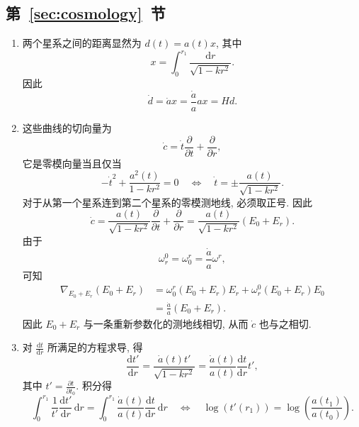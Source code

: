 \subsection{\texorpdfstring{第~\ref{sec:cosmology}~节}{宇宙学}}\label{subsec:solutions-cosmology}

\begin{description}[font=\normalfont,leftmargin=2em,labelwidth=1.5em]
\begin{enumerate}[label=(\alph*),ref=\alph*,leftmargin=*]
\item 两个星系之间的距离显然为 $d(t)=a(t)x$, 其中
\[
  x=\int_0^{r_1}\frac{\mathrm{d}r}{\sqrt{1-kr^2}}.
\]
因此
\[
  \dot d=\dot a x=\frac{\dot a}{a}ax=Hd.
\]
\item 这些曲线的切向量为
\[
  \dot c=\dot t\frac{\partial}{\partial t}+\frac{\partial}{\partial r},
\]
它是零模向量当且仅当
\[
  -\dot t^2+\frac{a^2(t)}{1-kr^2}=0
  \quad\Longleftrightarrow\quad \dot t=\pm\frac{a(t)}{\sqrt{1-kr^2}}.
\]
对于从第一个星系连到第二个星系的零模测地线, 必须取正号. 因此
\[
  \dot c=\frac{a(t)}{\sqrt{1-kr^2}}\frac{\partial}{\partial t}
    +\frac{\partial}{\partial r}=\frac{a(t)}{\sqrt{1-kr^2}}(E_0+E_r).
\]
由于
\[
  \omega_r^0=\omega_0^r=\frac{\dot a}{a}\omega^r,
\]
可知
\begin{align*}
  \nabla_{E_0+E_r}(E_0+E_r)
    &=\omega_0^r(E_0+E_r)E_r+\omega_r^0(E_0+E_r)E_0\\
    &=\frac{\dot a}{a}(E_0+E_r).
\end{align*}
因此 $E_0+E_r$ 与一条重新参数化的测地线相切, 从而 $\dot c$ 也与之相切.
\item 对 $\frac{\mathrm{d}t}{\mathrm{d}r}$ 所满足的方程求导, 得
\[
  \frac{\mathrm{d}t'}{\mathrm{d}r}
     =\frac{\dot a(t)t'}{\sqrt{1-kr^2}}
     =\frac{\dot a(t)}{a(t)}\frac{\mathrm{d}t}{\mathrm{d}r}t',
\]
其中 $t'=\frac{\partial t}{\partial t_0}$. 积分得
\[
  \int_0^{r_1}\frac{1}{t'}\frac{\mathrm{d}t'}{\mathrm{d}r}\,\mathrm{d}r
    =\int_0^{r_1}\frac{\dot a(t)}{a(t)}\frac{\mathrm{d}t}{\mathrm{d}r}\,\mathrm{d}r
    \quad\Longleftrightarrow\quad
    \log(t'(r_1))=\log\left(\frac{a(t_1)}{a(t_0)}\right).
\]
\end{enumerate}


\end{description}
